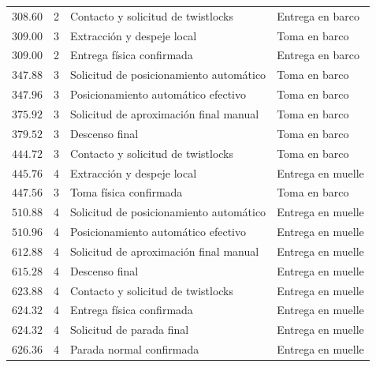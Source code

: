 \documentclass[a4paper,10pt,onecolumn,journal]{ieeeconf}
\numberwithin{equation}{section}
\begin{document}
\begin{longtable}{C{1.6cm} C{1.0cm} L{6.4cm} L{4.4cm}}
$308.60$ & 2 & Contacto y solicitud de twistlocks & Entrega en barco\\

$309.00$ & 3 & Extracción y despeje local & Toma en barco\\

$309.00$ & 2 & Entrega física confirmada & Entrega en barco\\

$347.88$ & 3 & Solicitud de posicionamiento automático & Toma en barco\\

$347.96$ & 3 & Posicionamiento automático efectivo & Toma en barco\\

$375.92$ & 3 & Solicitud de aproximación final manual & Toma en barco\\

$379.52$ & 3 & Descenso final & Toma en barco\\

$444.72$ & 3 & Contacto y solicitud de twistlocks & Toma en barco\\

$445.76$ & 4 & Extracción y despeje local & Entrega en muelle\\

$447.56$ & 3 & Toma física confirmada & Toma en barco\\

$510.88$ & 4 & Solicitud de posicionamiento automático & Entrega en muelle\\

$510.96$ & 4 & Posicionamiento automático efectivo & Entrega en muelle\\

$612.88$ & 4 & Solicitud de aproximación final manual & Entrega en muelle\\

$615.28$ & 4 & Descenso final & Entrega en muelle\\

$623.88$ & 4 & Contacto y solicitud de twistlocks & Entrega en muelle\\

$624.32$ & 4 & Entrega física confirmada & Entrega en muelle\\

$624.32$ & 4 & Solicitud de parada final & Entrega en muelle\\

$626.36$ & 4 & Parada normal confirmada & Entrega en muelle\\
\bottomrule\end{longtable}
\end{document}
